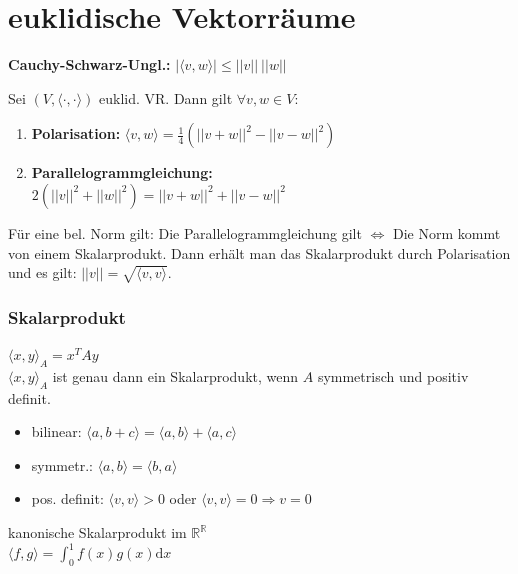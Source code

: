 \documentclass[german, fourcolumn, 8pt]{latex4ei/latex4ei_sheet}
\newcommand{\equival}[0]{\ensuremath{\Longleftrightarrow}}
\begin{document}
\section{euklidische Vektorräume}
\textbf{Cauchy-Schwarz-Ungl.:} $|\langle v,w \rangle| \le ||v|| \: ||w||$

\begin{sectionbox}
    Sei $(V, \langle \cdot, \cdot \rangle)$ euklid. VR. Dann gilt $\forall v,w \in V$:
    \begin{enumerate}
        \item \textbf{Polarisation:} $\langle v,w \rangle = \frac{1}{4}(||v+w||^2-||v-w||^2)$
        \item \textbf{Parallelogrammgleichung:}\\
              $2(||v||^2+||w||^2)=||v+w||^2+||v-w||^2$
    \end{enumerate}

    Für eine bel. Norm gilt: Die Parallelogrammgleichung gilt \equival \: Die Norm kommt von einem Skalarprodukt. Dann erhält man das Skalarprodukt durch Polarisation und es gilt: $||v||=\sqrt{\langle v, v \rangle}$.
\end{sectionbox}

\begin{sectionbox}
    \subsubsection{Skalarprodukt}
    $\langle x, y\rangle_A = x^TAy$\\
    $\langle x, y \rangle_A$ ist genau dann ein Skalarprodukt, wenn $A$ symmetrisch und positiv definit.
    \begin{itemize}
        \item bilinear: $\langle a,b+c\rangle = \langle a,b\rangle + \langle a,c \rangle$
        \item symmetr.: $\langle a,b \rangle = \langle b,a \rangle$
        \item pos. definit: $\langle v,v\rangle > 0$ oder $\langle v,v\rangle = 0 \Rightarrow v = 0$
    \end{itemize}

    kanonische Skalarprodukt im $\mathbb R^\mathbb R$\\
    \(
    \langle f, g \rangle = \int_{0}^{1}f(x)g(x)\mathrm dx
    \)
\end{sectionbox}
\end{document}
